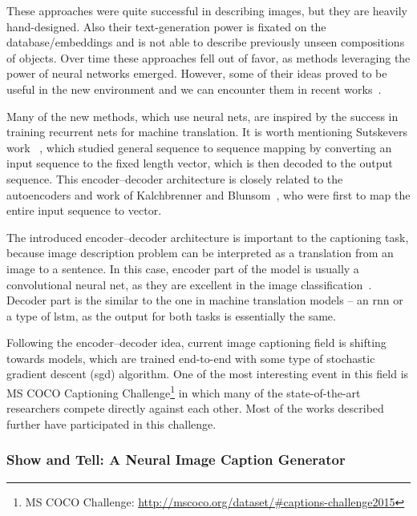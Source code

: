 These approaches were quite successful in describing images, but they are heavily hand-designed. Also their text-generation power is fixated on the database/embeddings and is not able to describe previously unseen compositions of objects. Over time these approaches fell out of favor, as methods leveraging the power of neural networks emerged. However, some of their ideas proved to be useful in the new environment and we can encounter them in recent works~\cite{DBLP:journals/corr/FangGISDDGHMPZZ14}.

Many of the new methods, which use neural nets, are inspired by the success in training recurrent nets for machine translation. It is worth mentioning Sutskevers work ~\cite{DBLP:journals/corr/SutskeverVL14}, which studied general sequence to sequence mapping by converting an input sequence to the fixed length vector, which is then decoded to the output sequence. This encoder--decoder architecture is closely related to the autoencoders and work of Kalchbrenner and Blunsom~\cite{conf/emnlp/KalchbrennerB13}, who were first to map the entire input sequence to vector.

The introduced encoder--decoder architecture is important to the captioning task, because image description problem can be interpreted as a translation from an image to a sentence. In this case, encoder part of the model is usually a convolutional neural net, as they are excellent in the image classification~\cite{DBLP:journals/corr/SzegedyLJSRAEVR14}. Decoder part is the similar to the one in machine translation models -- an \gls{rnn} or a type of \gls{lstm}, as the output for both tasks is essentially the same.

Following the encoder--decoder idea, current image captioning field is shifting towards models, which are trained end-to-end with some type of stochastic gradient descent (\gls{sgd}) algorithm.
One of the most interesting event in this field is MS COCO Captioning Challenge\footnote{MS COCO Challenge: \url{http://mscoco.org/dataset/\#captions-challenge2015}} in which many of the state-of-the-art researchers compete directly against each other. Most of the works described further have participated in this challenge.

\subsubsection{Show and Tell: A Neural Image Caption Generator} \label{subsubsec:showtell}


